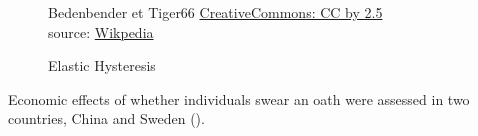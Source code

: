 \begin{figure}[!htbp]
    \centering
    \copyrightbox[r]{
        }
    {\textcopyright Bedenbender et Tiger66 \href{{https://creativecommons.org/licenses/by/2.5}}{CreativeCommons: CC by 2.5}\\source: \href{https://commons.wikimedia.org/wiki/File:Elastic_Hysteresis.svg}{Wikpedia}}
    \caption{Elastic Hysteresis}
    \label{fig:elastic-hysteresis}
\end{figure}

Economic effects of whether individuals swear an oath were assessed in two countries, China and Sweden (\cite{carlsson2013truth}). %
